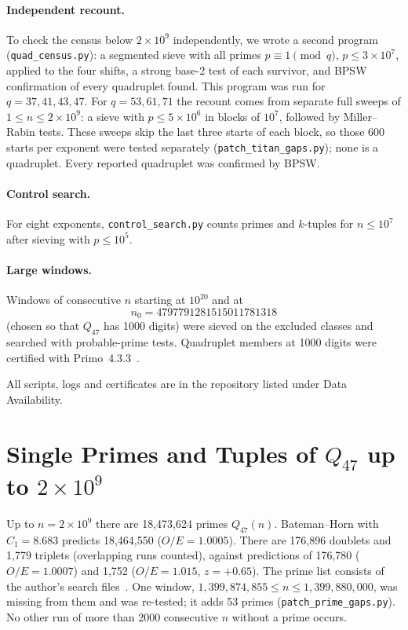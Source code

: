 \documentclass[11pt,a4paper]{article}
\theoremstyle{remark}
\begin{document}
\paragraph{Independent recount.} To check the census below $2\times10^9$ independently, we wrote a second program (\texttt{quad\_census.py}): a segmented sieve with all primes $p\equiv1\pmod q$, $p\le3\times10^7$, applied to the four shifts, a strong base-2 test of each survivor, and BPSW confirmation of every quadruplet found. This program was run for $q=37,41,43,47$. For $q=53,61,71$ the recount comes from separate full sweeps of $1\le n\le2\times10^9$: a sieve with $p\le5\times10^6$ in blocks of $10^7$, followed by Miller--Rabin tests. These sweeps skip the last three starts of each block, so those $600$ starts per exponent were tested separately (\texttt{patch\_titan\_gaps.py}); none is a quadruplet. Every reported quadruplet was confirmed by BPSW.
\paragraph{Control search.} For eight exponents, \texttt{control\_search.py} counts primes and $k$-tuples for $n\le10^7$ after sieving with $p\le10^5$.
\paragraph{Large windows.} Windows of consecutive $n$ starting at $10^{20}$ and at
\[n_0=4797791281515011781318\]
(chosen so that $Q_{47}$ has 1000 digits) were sieved on the excluded classes and searched with probable-prime tests. Quadruplet members at 1000 digits were certified with Primo~4.3.3~\cite{Primo}.

All scripts, logs and certificates are in the repository listed under Data Availability.

\section{Single Primes and Tuples of $Q_{47}$ up to $2\times10^9$}
Up to $n=2\times10^9$ there are 18,473,624 primes $Q_{47}(n)$. Bateman--Horn with $C_1=8.683$ predicts 18,464,550 ($O/E=1.0005$). There are 176,896 doublets and 1,779 triplets (overlapping runs counted), against predictions of 176,780 ($O/E=1.0007$) and 1,752 ($O/E=1.015$, $z=+0.65$). The prime list consists of the author's search files~\cite{Chen2}. One window, $1{,}399{,}874{,}855\le n\le1{,}399{,}880{,}000$, was missing from them and was re-tested; it adds 53 primes (\texttt{patch\_prime\_gaps.py}). No other run of more than 2000 consecutive $n$ without a prime occurs.
\end{document}
